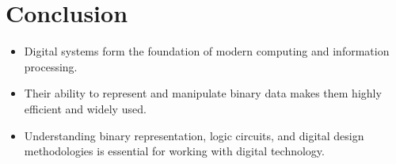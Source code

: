 \documentclass{article}
\begin{document}
\section{Conclusion}
\begin{itemize}
    \item Digital systems form the foundation of modern computing and information processing.
    \item Their ability to represent and manipulate binary data makes them highly efficient and widely used.
    \item Understanding binary representation, logic circuits, and digital design methodologies is essential for working with digital technology.
\end{itemize}
\end{document}
